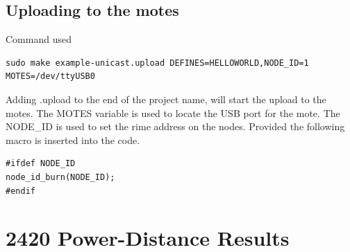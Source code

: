 \documentclass[a4paper,notitlepage]{article}
\begin{document}
\subsection{Uploading to the motes}
Command used
\begin{listing} 
\begin{verbatim}
sudo make example-unicast.upload DEFINES=HELLOWORLD,NODE_ID=1 MOTES=/dev/ttyUSB0
\end{verbatim}
\end{listing}
Adding .upload to the end of the project name, will start the upload to the motes. The MOTES variable is used to locate the USB port for the mote.
The NODE\_ID is used to set the rime address on the nodes. Provided the following macro is inserted into the code.

\begin{listing} 
\begin{verbatim}
#ifdef NODE_ID
node_id_burn(NODE_ID);
#endif
\end{verbatim}
\end{listing}

\clearpage




\clearpage



\clearpage

\appendixpage
\addappheadtotoc
\appendix



\newpage

\section{2420 Power-Distance Results}
\end{document}
